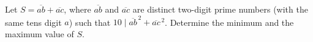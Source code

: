 Let $S=\overline{ab}+\overline{ac}$, where $\overline{ab}$ and $\overline{ac}$ are distinct two-digit prime numbers (with the same tens digit $a$) such that $10\mid\overline{ab}^{\,2}+\overline{ac}^{\,2}$. Determine the minimum and the maximum value of $S$.
